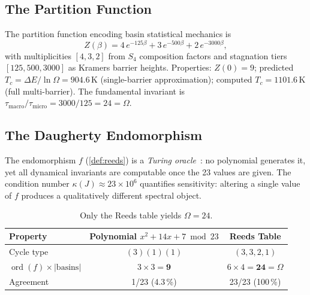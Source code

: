\documentclass[11pt,a4paper]{article}
\theoremstyle{plain}
\theoremstyle{remark}
\renewcommand{\Omega}{\varOmega}
\newcommand{\ord}{\operatorname{ord}}
\begin{document}
\subsection{The Partition Function}
\label{sec:partition}

The partition function encoding basin statistical mechanics is
\begin{equation}\label{eq:partition}
  Z(\beta) = 4\,e^{-125\beta} + 3\,e^{-500\beta} + 2\,e^{-3000\beta},
\end{equation}
with multiplicities $[4,3,2]$ from $S_4$ composition factors and stagnation
tiers $[125,500,3000]$ as Kramers barrier heights.  Properties:
$Z(0)=9$; predicted $T_c = \Delta E/\ln\Omega = 904.6$\,K (single-barrier
approximation); computed $T_c = 1101.6$\,K (full multi-barrier).  The
fundamental invariant is
$\tau_{\mathrm{macro}}/\tau_{\mathrm{micro}}=3000/125=24=\Omega$.

\subsection{The Daugherty Endomorphism}
\label{sec:soyga}

The endomorphism $f$ (\cref{def:reeds}) is a \emph{Turing
oracle}~\cite{turing1939}: no polynomial generates it, yet all dynamical
invariants are computable once the 23 values are given.  The condition
number $\kappa(J)\approx 23\times 10^6$ quantifies sensitivity: altering
a single value of $f$ produces a qualitatively different spectral object.

\begin{table}[H]
\centering\small
\begin{tabular}{@{}lcc@{}}
\toprule
Property & Polynomial $x^2\!+14x+7\bmod 23$ & Reeds Table\\
\midrule
Cycle type         & $(3)(1)(1)$              & $(3,3,2,1)$\\
$\ord(f)\times|\mathrm{basins}|$
                   & $3\times 3=\mathbf{9}$   & $6\times 4=\mathbf{24}=\Omega$\\
Agreement          & 1/23 (4.3\,\%)           & 23/23 (100\,\%)\\
\bottomrule
\end{tabular}
\caption{Only the Reeds table yields $\Omega=24$.}
\label{tab:comparison}
\end{table}

\end{document}

